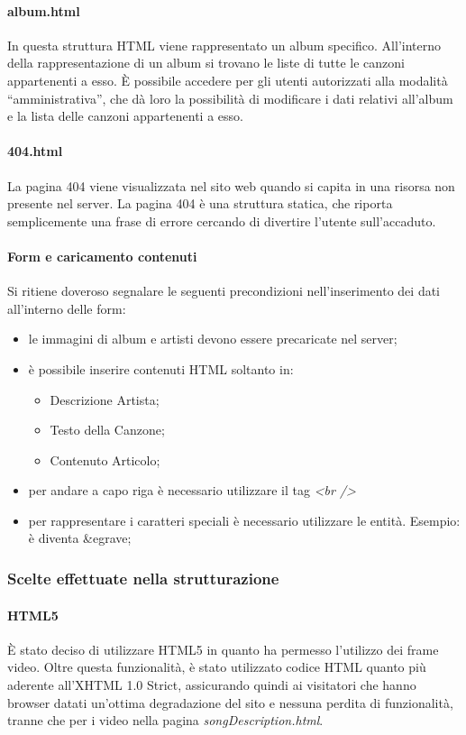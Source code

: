 \paragraph*{album.html} In questa struttura HTML viene rappresentato un album specifico. All'interno della rappresentazione di un album si trovano le liste di tutte le canzoni appartenenti a esso. È possibile accedere per gli utenti autorizzati alla modalità ``amministrativa'', che d\`a loro la possibilità di modificare i dati relativi all'album e la lista delle canzoni appartenenti a esso. %

\paragraph*{404.html} La pagina 404 viene visualizzata nel sito web quando si capita in una risorsa non presente nel server. La pagina 404 è una struttura statica, che riporta semplicemente una frase di errore cercando di divertire l'utente sull'accaduto.

\paragraph*{Form e caricamento contenuti}Si ritiene doveroso segnalare le seguenti precondizioni nell'inserimento dei dati all'interno delle form:
\begin{itemize}
	\item le immagini di album e artisti devono essere precaricate nel server;
	\item \`e possibile inserire contenuti HTML soltanto in:
	\begin{itemize}
		\item Descrizione Artista;
		\item Testo della Canzone;
		\item Contenuto Articolo;
	\end{itemize}
	\item per andare a capo riga \`e necessario utilizzare il tag \textit{<br />}
	\item per rappresentare i caratteri speciali \`e necessario utilizzare le entit\`a. Esempio: \`e diventa \&egrave;
\end{itemize}

\subsubsection{Scelte effettuate nella strutturazione}

\paragraph{HTML5}
È stato deciso di utilizzare HTML5 in quanto ha permesso l'utilizzo dei frame video. Oltre questa funzionalità, è stato utilizzato codice HTML quanto più aderente all'XHTML 1.0 Strict, assicurando quindi ai visitatori che hanno browser datati un'ottima degradazione del sito e nessuna perdita di funzionalità, tranne che per i video nella pagina \textit{songDescription.html}.
